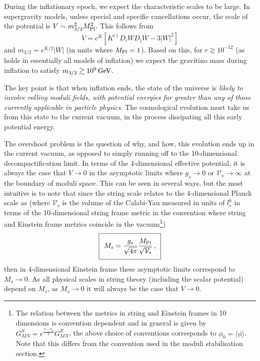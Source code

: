 During the inflationary epoch, we expect the characteristic scales to be large. In supergravity models, unless special and specific cancellations occur, the scale of the potential is $V \sim m_{3/2}^2 M_{\rm Pl}^2$. This follows from
\begin{equation}
V = e^K \left[ K^{i\bar{\jmath}} D_i W D_{\bar{\jmath}} \overline{W} - 3 \vert W \vert^2 \right]
\end{equation}
and $m_{3/2} = e^{K/2} \vert W \vert$ (in units where $M_{\rm Pl} = 1$). Based on this, for $r \gtrsim 10^{-12}$ (as holds in essentially all models of inflation) we expect the gravitino mass during inflation to satisfy $m_{3/2} \gtrsim 10^9 \, \rm{GeV}$.

The key point is that when inflation ends, the state of the universe is \emph{likely to involve rolling moduli fields, with potential energies far greater than any of those currently applicable in particle physics}. The cosmological evolution must take us from this state to the current vacuum, in the process dissipating all this early potential energy. 

The overshoot problem is the question of why, and how, this evolution ends up in the current vacuum, as opposed to simply running off to the 10-dimensional decompactification limit. In terms of the 4-dimensional effective potential, it is always the case that $V \to 0$ 
in the asymptotic limits where $g_s \to 0$ or $\mathcal{V}_s \to \infty$ at the boundary of moduli space. This can be seen in several ways, but the most intuitive is to note that since the string scale relates to the 4-dimensional Planck scale as (where $\mathcal{V}_s$ is the volume of the Calabi-Yau measured in units of $l_s^6$ in terms of the 10-dimensional string frame metric in the convention where string and Einstein frame metrics coincide in the vacuum\footnote{The relation between the metrics in string and Einstein frames in 10 dimensions is convention dependent and in general is given by  $G_{MN}^S = e^{\frac{\phi-\phi_0}{2}}G_{MN}^E$, the above choice of conventions corresponds to 
$\phi_0= \langle \phi \rangle$. Note that this differs from the convention used in the moduli stabilisation section.})
%
\begin{equation}
\label{convvvv}
\setlength\fboxsep{0.25cm}
\setlength\fboxrule{0.4pt}
\boxed{
M_s = \frac{g_s}{\sqrt{4\pi}}\frac{M_{\rm Pl}}{\sqrt{\mathcal{V}_s}}\,,
}
\end{equation}
then in 4-dimensional Einstein frame these asymptotic limits correspond to $M_s \to 0$. As all physical scales in string theory (including the scalar potential) depend on $M_s$, as $M_s \to 0$ it will always be the case that $V \to 0$.

